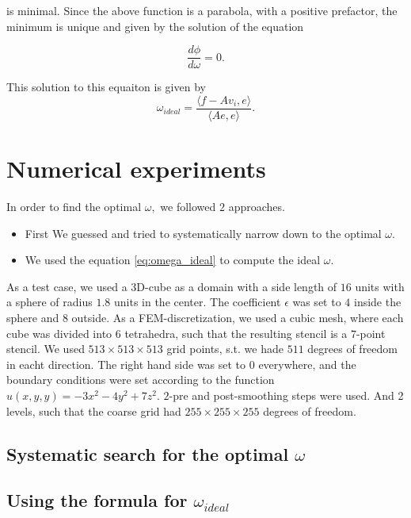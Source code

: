 \documentclass[12pt, a4paper]{article}
\begin{document}
\noindent
is minimal. Since the above function is a parabola, with a positive prefactor, the minimum is unique and given by the solution of the equation 

\begin{equation}
  \frac{d \phi}{d \omega} = 0.
\end{equation}

\noindent
This solution to this equaiton is given by
\begin{equation}
  \omega_{\textit{ideal}} = \frac{\langle f - A v_i, e \rangle}{\langle A e, e \rangle}.
  \label{eq:omega_ideal}
\end{equation}


\newpage

\section{Numerical experiments}

In order to find the optimal $\omega,$ we followed $2$ approaches. 
\begin{itemize}
  \item[1.)] First We guessed and tried to systematically narrow down to the optimal $\omega.$
  \item[2.)] We used the equation \eqref{eq:omega_ideal} to compute the ideal $\omega$.
\end{itemize}

\noindent
As a test case, we used a 3D-cube as a domain with a side length of $16$ units with a sphere of radius $1.8$ units in the center. The coefficient $\epsilon$ was set to $4$ inside the sphere and $8$ outside. As a FEM-discretization, we used a cubic mesh, where each cube was divided into $6$ tetrahedra, such that the resulting stencil is a $7$-point stencil. We used $513 \times 513 \times 513$ grid points, s.t. we hade $511$ degrees of freedom in eacht direction. The right hand side was set to $0$ everywhere, and the boundary conditions were set according to the function $u(x, y, y) = -3x^2 - 4y^2+7z^2$. $2$-pre and post-smoothing steps were used. And 2 levels, such that the coarse grid had $255 \times 255 \times 255$ degrees of freedom.


\subsection{Systematic search for the optimal $\omega$}

\subsection{Using the formula for $\omega_{\textit{ideal}}$}
\end{document}
